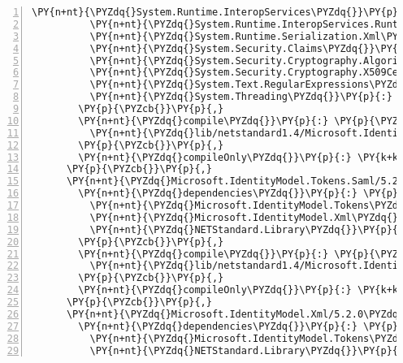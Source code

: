 \begin{Verbatim}[commandchars=\\\{\},numbers=left,firstnumber=1,stepnumber=1,numberblanklines=0]
          \PY{n+nt}{\PYZdq{}System.Runtime.InteropServices\PYZdq{}}\PY{p}{:} \PY{l+s+s2}{\PYZdq{}4.3.0\PYZdq{}}\PY{p}{,}
          \PY{n+nt}{\PYZdq{}System.Runtime.InteropServices.RuntimeInformation\PYZdq{}}\PY{p}{:} \PY{l+s+s2}{\PYZdq{}4.3.0\PYZdq{}}\PY{p}{,}
          \PY{n+nt}{\PYZdq{}System.Runtime.Serialization.Xml\PYZdq{}}\PY{p}{:} \PY{l+s+s2}{\PYZdq{}4.3.0\PYZdq{}}\PY{p}{,}
          \PY{n+nt}{\PYZdq{}System.Security.Claims\PYZdq{}}\PY{p}{:} \PY{l+s+s2}{\PYZdq{}4.3.0\PYZdq{}}\PY{p}{,}
          \PY{n+nt}{\PYZdq{}System.Security.Cryptography.Algorithms\PYZdq{}}\PY{p}{:} \PY{l+s+s2}{\PYZdq{}4.3.0\PYZdq{}}\PY{p}{,}
          \PY{n+nt}{\PYZdq{}System.Security.Cryptography.X509Certificates\PYZdq{}}\PY{p}{:} \PY{l+s+s2}{\PYZdq{}4.3.0\PYZdq{}}\PY{p}{,}
          \PY{n+nt}{\PYZdq{}System.Text.RegularExpressions\PYZdq{}}\PY{p}{:} \PY{l+s+s2}{\PYZdq{}4.3.0\PYZdq{}}\PY{p}{,}
          \PY{n+nt}{\PYZdq{}System.Threading\PYZdq{}}\PY{p}{:} \PY{l+s+s2}{\PYZdq{}4.3.0\PYZdq{}}
        \PY{p}{\PYZcb{}}\PY{p}{,}
        \PY{n+nt}{\PYZdq{}compile\PYZdq{}}\PY{p}{:} \PY{p}{\PYZob{}}
          \PY{n+nt}{\PYZdq{}lib/netstandard1.4/Microsoft.IdentityModel.Tokens.dll\PYZdq{}}\PY{p}{:} \PY{p}{\PYZob{}}\PY{p}{\PYZcb{}}
        \PY{p}{\PYZcb{}}\PY{p}{,}
        \PY{n+nt}{\PYZdq{}compileOnly\PYZdq{}}\PY{p}{:} \PY{k+kc}{true}
      \PY{p}{\PYZcb{}}\PY{p}{,}
      \PY{n+nt}{\PYZdq{}Microsoft.IdentityModel.Tokens.Saml/5.2.0\PYZdq{}}\PY{p}{:} \PY{p}{\PYZob{}}
        \PY{n+nt}{\PYZdq{}dependencies\PYZdq{}}\PY{p}{:} \PY{p}{\PYZob{}}
          \PY{n+nt}{\PYZdq{}Microsoft.IdentityModel.Tokens\PYZdq{}}\PY{p}{:} \PY{l+s+s2}{\PYZdq{}5.2.0\PYZdq{}}\PY{p}{,}
          \PY{n+nt}{\PYZdq{}Microsoft.IdentityModel.Xml\PYZdq{}}\PY{p}{:} \PY{l+s+s2}{\PYZdq{}5.2.0\PYZdq{}}\PY{p}{,}
          \PY{n+nt}{\PYZdq{}NETStandard.Library\PYZdq{}}\PY{p}{:} \PY{l+s+s2}{\PYZdq{}2.0.3\PYZdq{}}
        \PY{p}{\PYZcb{}}\PY{p}{,}
        \PY{n+nt}{\PYZdq{}compile\PYZdq{}}\PY{p}{:} \PY{p}{\PYZob{}}
          \PY{n+nt}{\PYZdq{}lib/netstandard1.4/Microsoft.IdentityModel.Tokens.Saml.dll\PYZdq{}}\PY{p}{:} \PY{p}{\PYZob{}}\PY{p}{\PYZcb{}}
        \PY{p}{\PYZcb{}}\PY{p}{,}
        \PY{n+nt}{\PYZdq{}compileOnly\PYZdq{}}\PY{p}{:} \PY{k+kc}{true}
      \PY{p}{\PYZcb{}}\PY{p}{,}
      \PY{n+nt}{\PYZdq{}Microsoft.IdentityModel.Xml/5.2.0\PYZdq{}}\PY{p}{:} \PY{p}{\PYZob{}}
        \PY{n+nt}{\PYZdq{}dependencies\PYZdq{}}\PY{p}{:} \PY{p}{\PYZob{}}
          \PY{n+nt}{\PYZdq{}Microsoft.IdentityModel.Tokens\PYZdq{}}\PY{p}{:} \PY{l+s+s2}{\PYZdq{}5.2.0\PYZdq{}}\PY{p}{,}
          \PY{n+nt}{\PYZdq{}NETStandard.Library\PYZdq{}}\PY{p}{:} \PY{l+s+s2}{\PYZdq{}2.0.3\PYZdq{}}

\end{Verbatim}

